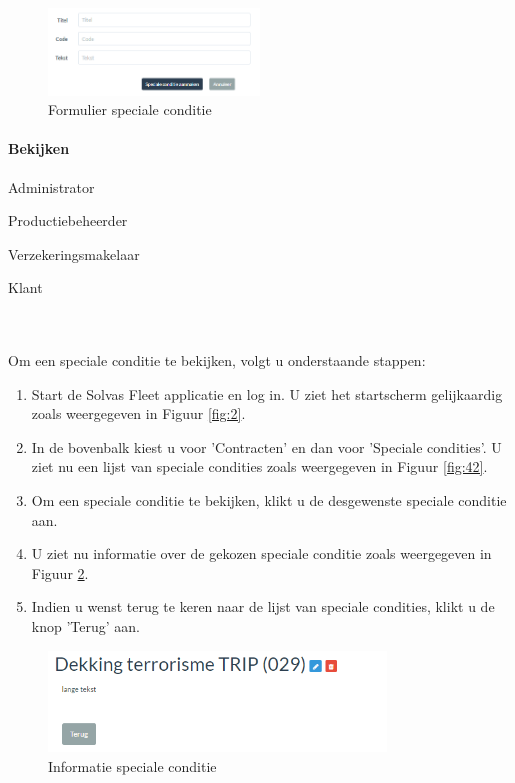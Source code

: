 \documentclass[11pt,openany]{article}
\newcommand{\cmark}{\ding{51}}%
\newcommand{\done}{\rlap{$\square$}{\raisebox{2pt}{\large\hspace{1pt}\cmark}}%
	\hspace{-2.5pt}}
\begin{document}
\begin{figure}
	\centering
	\includegraphics[width=0.5\textwidth]{img/fig43.png}
	\caption{Formulier speciale conditie} 
	\label{fig:43} 
\end{figure}


\paragraph{Bekijken}
\label{special_conditions_show}
\begin{todolist}
	\item[\done] Administrator
	\item[\done] Productiebeheerder
	\item[\done] Verzekeringsmakelaar
	\item[\done] Klant 
\end{todolist}
\\
\\
Om een speciale conditie te bekijken, volgt u onderstaande stappen:
\begin{enumerate}
	\item Start de Solvas Fleet applicatie en log in. U ziet het startscherm gelijkaardig zoals weergegeven in Figuur \ref{fig:2}.
	\item In de bovenbalk kiest u voor 'Contracten' en dan voor 'Speciale condities'. U ziet nu een lijst van speciale condities zoals weergegeven in Figuur \ref{fig:42}. 
	\item Om een speciale conditie te bekijken, klikt u de desgewenste speciale conditie aan. 
	\item U ziet nu informatie over de gekozen speciale conditie zoals weergegeven in Figuur \ref{fig:44}. 
	\item Indien u wenst terug te keren naar de lijst van speciale condities, klikt u de knop 'Terug' aan.
\end{enumerate}

\begin{figure}
	\centering
	\includegraphics[width=0.8\textwidth]{img/fig44.png}
	\caption{Informatie speciale conditie } 
	\label{fig:44} 
\end{figure}
\end{document}
